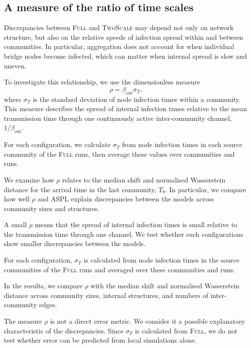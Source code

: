 \documentclass[a4paper,fleqn]{cas-sc}
\newcommand{\Full}{\textup{\textsc{Full}}}
\newcommand{\TS}{\textup{\textsc{TwoScale}}}
\begin{document}
\subsection{A measure of the ratio of time scales}
\label{sec:descriptor}

Discrepancies between \Full{} and \TS{} may depend not only on network structure, but also on the relative speeds of infection spread within and between communities. In particular, aggregation does not account for when individual bridge nodes become infected, which can matter when internal spread is slow and uneven.

To investigate this relationship, we use the dimensionless measure
\begin{equation}
\label{eq:rho}
\rho=\beta_{\mathrm{out}}\sigma_T,
\end{equation}
where $\sigma_T$ is the standard deviation of node infection times within a community. This measure describes the spread of internal infection times relative to the mean transmission time through one continuously active inter-community channel, $1/\beta_{\mathrm{out}}$.

For each configuration, we calculate $\sigma_T$ from node infection times in each source community of the \Full{} runs, then average these values over communities and runs.

We examine how $\rho$ relates to the median shift and normalised Wasserstein distance for the arrival time in the last community, $T_9$. In particular, we compare how well $\rho$ and ASPL explain discrepancies between the models across community sizes and structures.

A small $\rho$ means that the spread of internal infection times is small relative to the transmission time through one channel. We test whether such configurations show smaller discrepancies between the models.

For each configuration, $\sigma_T$ is calculated from node infection times in the source communities of the \Full{} runs and averaged over these communities and runs.

In the results, we compare $\rho$ with the median shift and normalised Wasserstein distance across community sizes, internal structures, and numbers of inter-community edges.

The measure $\rho$ is not a direct error metric. We consider it a possible explanatory characteristic of the discrepancies. Since $\sigma_T$ is calculated from \Full{}, we do not test whether error can be predicted from local simulations alone.
\end{document}
